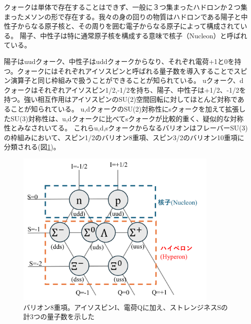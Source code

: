 \documentclass[a4paper,11pt,uplatex]{jsbook}
\begin{document}
クォークは単体で存在することはできず、一般に３つ集まったハドロンか２つ集まったメソンの形で存在する。我々の身の回りの物質はハドロンである陽子と中性子からなる原子核と、その周りを囲む電子からなる原子によって構成されている。
陽子、中性子は特に通常原子核を構成する意味で核子（Nucleon）と呼ばれている。

陽子はuudクォーク、中性子はuddクォークからなり、それぞれ電荷+1と0を持つ。クォークにはそれぞれアイソスピンと呼ばれる量子数を導入することでスピン演算子と同じ枠組みで扱うことができることが知られている。
uクォーク、dクォークはそれぞれアイソスピン1/2,-1/2を持ち、陽子、中性子は+1/2、-1/2を持つ。強い相互作用はアイソスピンのSU(2)空間回転に対してほとんど対称であることが知られている。
u,dクォークのSU(2)対称性にsクォークを加えて拡張したSU(3)対称性は、u,dクォークに比べてsクォークが比較的重く、疑似的な対称性とみなされいてる。
これらu,d,sクォークからなるバリオンはフレーバーSU(3)の枠組みにおいて、スピン1/2のバリオン8重項、スピン3/2のバリオン10重項に分類される(図\ref{fig:baryon})。
\begin{figure}[tb]
  \centering
  \includegraphics[width=10cm]{image/1_baryon.png}
  \caption[バリオン8重項]{バリオン8重項。アイソスピンI、電荷Qに加え、ストレンジネスSの計3つの量子数を示した}
  \label{fig:baryon}
\end{figure}
\end{document}
